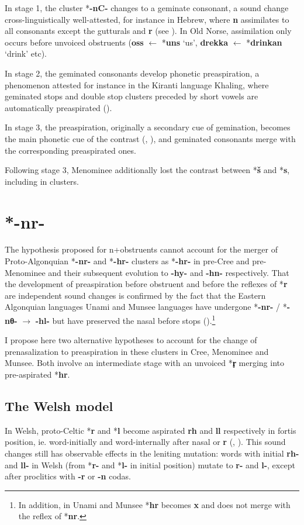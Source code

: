 \documentclass[oneside,a4paper,11pt]{article}
\newcommand{\ipa}[1]{{\phon\mbox{\textbf{#1}}}}
\begin{document}
In stage 1, the cluster *\ipa{-nC-} changes to a geminate consonant, a sound change cross-linguistically well-attested, for instance in Hebrew, where \ipa{n} assimilates to all consonants except the gutturals and \ipa{r} (see \citealt[71-75]{jouon06}). In Old Norse, assimilation only occurs before unvoiced obstruents (\ipa{oss} $\leftarrow$ *\ipa{uns} `us', \ipa{drekka} $\leftarrow$ *\ipa{drinkan} `drink' etc). 

In stage 2, the geminated consonants develop phonetic preaspiration, a phenomenon attested for instance in the Kiranti language  Khaling, where geminated stops and double stop clusters preceded by short vowels are automatically preaspirated (\citealt[44]{jacques16tonogenesis}).

In stage 3, the preaspiration, originally a secondary cue of gemination, becomes the main phonetic cue of the contrast (\citealt[172]{kuemmel07wandel}, \citealt{silverman03preaspirated}), and geminated consonants merge with the corresponding preaspirated ones. 

Following stage 3, Menominee additionally lost the contrast between *\ipa{š} and *\ipa{s}, including in clusters.
  
 \section{*-nr-}
The hypothesis proposed for n+obstruents cannot account for the merger of Proto-Algonquian *\ipa{-nr-} and *\ipa{-hr-} clusters as *\ipa{-hr-} in pre-Cree and pre-Menominee and their subsequent evolution to \ipa{-hy-} and \ipa{-hn-} respectively. That the development of preaspiration before obstruent and before the reflexes of *\ipa{r} are independent sound changes is confirmed by the fact that the Eastern Algonquian languages Unami and Munsee languages have undergone *\ipa{-nr-} / *\ipa{-nθ-} $\rightarrow$ \ipa{-hl-} but have preserved the nasal before stops (\citealt[25]{goddard82munsee}).\footnote{In addition, in Unami and Munsee *\ipa{hr} becomes \ipa{x} and does not merge with the reflex of *\ipa{nr}.}

I propose here two alternative hypotheses to account for the change of prenasalization to preaspiration in these clusters in Cree, Menominee and Munsee. Both involve an intermediate stage with an unvoiced *\ipa{r̥} merging into pre-aspirated *\ipa{hr}.

\subsection{The Welsh model}
In Welsh, proto-Celtic *\ipa{r} and *\ipa{l} become aspirated \ipa{rh} and \ipa{ll} respectively in fortis position, ie. word-initially  and word-internally after nasal or \ipa{r} (\citealt[145]{kuemmel07wandel}, \citealt[471-480]{jackson56early}). This sound changes still has observable effects in the leniting mutation: words with initial \ipa{rh-} and \ipa{ll-} in Welsh (from *\ipa{r-} and *\ipa{l-} in initial position) mutate to \ipa{r-} and \ipa{l-}, except after proclitics with \ipa{-r} or \ipa{-n} codas.
\end{document}

